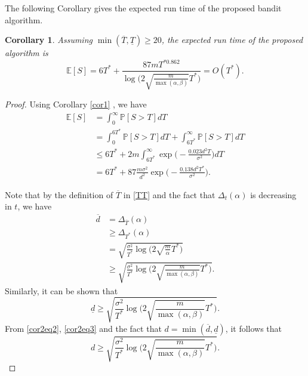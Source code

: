\documentclass[12pt]{article}
\def\E{\mathbb{E}}
\def\P{\mathbb{P}}
\def\d{\overline{d}}
\def\dd{\underline{d}}
\def\T{\overline{T}}
\def\TT{\underline{T}}
\newtheorem{corollary}[theorem]{Corollary}
\begin{document}
The following Corollary gives the expected run time of the proposed bandit algorithm.

\begin{corollary}
\label{cor2}
Assuming $\min(\T,\TT)\geq 20$, the expected run time of the proposed algorithm is 
\begin{equation}
\E[S] = 6T^* + \frac{87mT^{*0.862}}{\log\Big(2\sqrt{\frac{m}{\max(\alpha,\beta)}}T^*\Big)} = O(T^*). 
\end{equation}
\end{corollary}

\begin{proof}
Using Corollary \ref{cor1} , we have
\begin{equation}
\label{cor2eq1}
\begin{aligned}
\E[S] & = \int_0^\infty \P[S>T]dT\\
& = \int_0^{6T^*} \P[S>T]dT + \int_{6T^*}^\infty \P[S>T]dT\\
& \leq 6T^* + 2m\int_{6T^*}^\infty \exp\bigg(-\frac{0.023d^2 T}{\sigma^2}\bigg)dT\\
& = 6T^* + 87\frac{m\sigma^2}{d^2} \exp\bigg(-\frac{0.138 d^2 T^*}{\sigma^2}\bigg).
\end{aligned}
\end{equation}

Note that by the definition of $\T$ in \eqref{TT} and the fact that $\Delta_t(\alpha)$ is decreasing in $t$, we have
\begin{equation}
\label{cor2eq2}
\begin{aligned}
\d  &= \Delta_{\T}(\alpha) \\
&\geq \Delta_{T^*} (\alpha) \\
&= \sqrt{\frac{\sigma^2}{T^*}\log\Big(2\sqrt{\frac{m}{\alpha}}T^*\Big)} \\
&\geq \sqrt{\frac{\sigma^2}{T^*}\log\Big(2\sqrt{\frac{m}{\max(\alpha,\beta)}}T^*\Big)}.
\end{aligned}
\end{equation}
Similarly, it can be shown that 
\begin{equation}
\label{cor2eq3}
\dd \geq \sqrt{\frac{\sigma^2}{T^*}\log\Big(2\sqrt{\frac{m}{\max(\alpha,\beta)}}T^*\Big)}.
\end{equation}
From \eqref{cor2eq2}, \eqref{cor2eq3} and the fact that $d = \min(\d,\dd)$, it follows that 
\begin{equation}
\label{cor2eq4}
d \geq \sqrt{\frac{\sigma^2}{T^*}\log\Big(2\sqrt{\frac{m}{\max(\alpha,\beta)}}T^*\Big)}.
\end{equation}


\end{proof}
\end{document}
